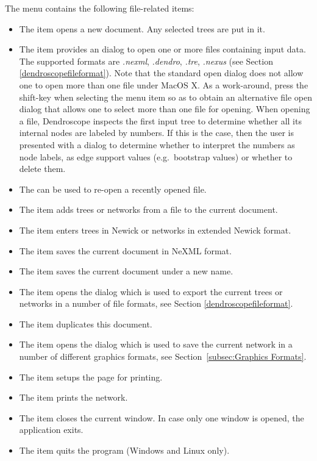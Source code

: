 \documentclass[11pt]{article}
\begin{document}
The  menu contains the following file-related items:
\begin{itemize}
\item The  item opens a new document. Any selected trees are put in it.
\item The  item provides an  dialog
to open one or more files containing input data. The supported formats are 
\textit{.nexml}, \textit{.dendro}, \textit{.tre}, \textit{.nexus} (see Section \ref{dendroscopefileformat}).
Note that the standard open dialog does not allow one to open more than one file under MacOS X.
As a work-around, press the shift-key when selecting the    menu item so as to obtain
an alternative file open dialog that allows one to select more than one file for opening.
When opening a file, Dendroscope inspects the first input tree to determine whether
all its internal nodes are labeled by numbers. If this is the case,
then the user is presented with a dialog to determine whether
to interpret the numbers as node labels, as edge support values (e.g.\ bootstrap values)
or whether to delete them.
\item The  can be used to re-open a recently opened file.
\item The  item adds trees or networks from a file to the current document.
\item The  item enters trees in Newick or networks in extended Newick format.
\item The  item saves the current document in NeXML format.
\item The  item saves the current document under a new name.
\item The  item 
opens the  dialog
which is used to export the current trees or networks in a number of file 
formats, see  Section \ref{dendroscopefileformat}. 
\item The  item duplicates this document.
\item The  item  opens the  dialog
which is used to save the current network in a number of different graphics
formats, see Section~\ref{subsec:Graphics Formats}.
\item The  item setups the page for printing.
\item The  item prints the network.
\item The  item closes the current window. In case only one window is opened, the application exits.
\item The  item quits the program (Windows and Linux only).
\end{itemize}   
\end{document}
